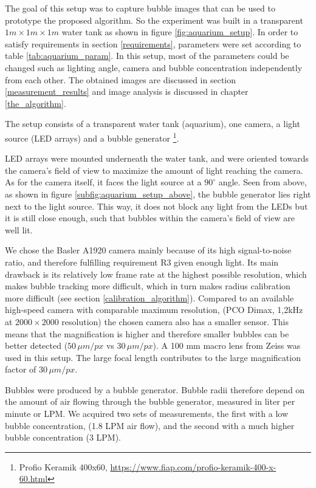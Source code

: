 		The goal of this setup was to capture bubble images that can be used to prototype the proposed algorithm. So the experiment was built in a transparent $1m \times 1m \times 1m$ water tank as shown in figure \ref{fig:aquarium_setup}. In order to satisfy requirements in section \ref{requirements}, parameters were set according to table \ref{tab:aquarium_param}. 
		 In this setup, most of the parameters could be changed such as lighting angle, camera and bubble concentration independently from each other. The obtained images are discussed in section \ref{measurement_results} and image analysis is discussed in chapter \ref{the_algorithm}.
		 
		 The setup consists of a transparent water tank (aquarium), one camera, a light source (LED arrays) and a bubble generator \footnote{Profio Keramik 400x60, \url{https://www.fiap.com/profio-keramik-400-x-60.html}}. 
		 
		 LED arrays were mounted underneath the water tank, and were oriented towards the camera's field of view to maximize the amount of light reaching the camera. As for the camera itself, it faces the light source at a $90^\circ$ angle. 
		 Seen from above, as shown in figure \ref{subfig:aquarium_setup_above}, the bubble generator lies right next to the light source. This way, it does not block any light from the LEDs but it is still close enough, such that bubbles within the camera's field of view are well lit. 
		
		We chose the Basler A1920 camera mainly because of its high signal-to-noise ratio, and therefore fulfilling requirement R3 given enough light. Its main drawback is its relatively low frame rate at the highest possible resolution, which makes bubble tracking more difficult, which in turn makes radius calibration more difficult (see section \ref{calibration_algorithm}). Compared to an available high-speed camera with comparable maximum resolution, (PCO Dimax, 1,2kHz at $2000 \times 2000$ resolution) the chosen camera also has a smaller sensor. This means that the magnification is higher and therefore smaller bubbles can be better detected ($50 \, \mu m/px$ vs $30 \, \mu m /px$). A 100 mm macro lens from Zeiss was used in this setup. The large focal length contributes to the large magnification factor of $30 \, \mu m /px$.
	
	Bubbles were produced by a bubble generator. Bubble radii therefore depend on the amount of air flowing through the bubble generator, measured in liter per minute or LPM. We acquired two sets of measurements, the first with a low bubble concentration, (1.8 LPM air flow), and the second with a much higher bubble concentration (3 LPM). 
		
